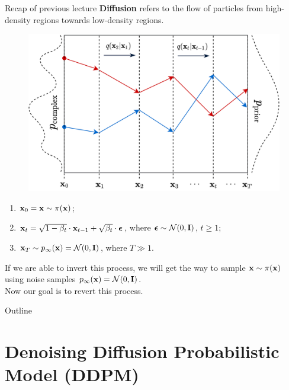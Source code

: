 \begin{frame}{Recap of previous lecture}
	\textbf{Diffusion} refers to the flow of particles from high-density regions towards low-density regions.
	\vspace{-0.2cm}
	\begin{figure}
		\includegraphics[width=0.5\linewidth]{figs/diffusion_over_time}
	\end{figure}
	\vspace{-0.6cm}
	\begin{enumerate}
		\item $\mathbf{x}_0 = \mathbf{x} \sim \pi(\mathbf{x})$;
		\item $\mathbf{x}_t = \sqrt{1 - \beta_t} \cdot \mathbf{x}_{t - 1} + \sqrt{\beta_t} \cdot \boldsymbol{\epsilon}$, where $\boldsymbol{\epsilon} \sim \mathcal{N}(0, \mathbf{I})$, $t \geq 1$;
		\item $\mathbf{x}_T \sim p_{\infty}(\mathbf{x}) = \mathcal{N}(0, \mathbf{I})$, where $T \gg 1$.
	\end{enumerate}
	If we are able to invert this process, we will get the way to sample $\mathbf{x} \sim \pi(\mathbf{x})$ using noise samples $p_{\infty}(\mathbf{x}) = \mathcal{N}(0, \mathbf{I})$. \\ 
	Now our goal is to revert this process.
\end{frame}
\begin{frame}{Outline}
	\tableofcontents
\end{frame}
\section{Denoising Diffusion Probabilistic Model (DDPM)}
